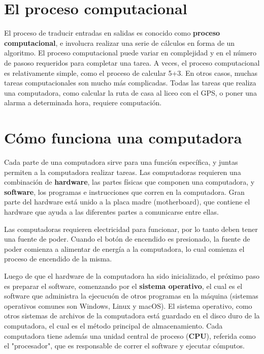 \documentclass[11pt]{article}
\begin{document}
\section{El proceso computacional}
\label{sec-3}
El proceso de traducir entradas en salidas es conocido como \textbf{proceso computacional}, e involucra realizar una serie de cálculos en forma de un algoritmo.
El proceso computacional puede variar en complejidad y en el número de pasoso requeridos para completar una tarea. A veces, el proceso computacional es relativamente simple, como el proceso de calcular 5+3. En otros casos, muchas tareas computacionales son mucho más complicadas. Todas las tareas que realiza una computadora, como calcular la ruta de casa al liceo con el GPS, o poner una alarma a determinada hora, requiere computación.

\section{Cómo funciona una computadora}
\label{sec-4}
Cada parte de una computadora sirve para una función específica, y juntas permiten a la computadora realizar tareas. Las computadoras requieren una combinación de \textbf{hardware}, las partes físicas que componen una computadora, y \textbf{software}, los programas e instrucciones que corren en la computadora. Gran parte del hardware está unido a la placa madre (motherboard), que contiene el hardware que ayuda a las diferentes partes a comunicarse entre ellas.

Las computadoras requieren electricidad para funcionar, por lo tanto deben tener una fuente de poder. Cuando el botón de encendido es presionado, la fuente de poder comienza a alimentar de energía a la computadora, lo cual comienza el proceso de encendido de la misma.

Luego de que el hardware de la computadora ha sido inicializado, el próximo paso es preparar el software, comenzando por el \textbf{sistema operativo}, el cual es el software que administra la ejecucuón de otros programas en la máquina (sistemas operativos comunes son Windows, Linux y macOS). El sistema operativo, como otros sistemas de archivos de la computadora está guardado en el disco duro de la computadora, el cual es el método principal de almacenamiento. Cada computadora tiene además una unidad central de proceso (\textbf{CPU}), referida como el "procesador", que es responsable de correr el software y ejecutar cómputos.
\end{document}
